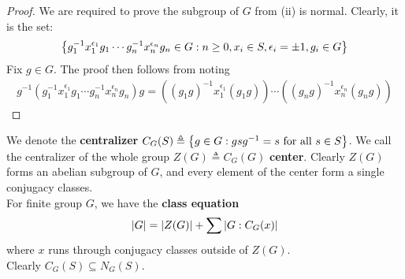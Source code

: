 \documentclass{report}
\begin{document}
\begin{proof}
We are required to prove the subgroup of $G$ from (ii) is normal. Clearly, it is the set:
\begin{align*}
\left\{ g_1^{-1}x_1^{\epsilon _1}g_1 \cdots g_n^{-1}x_n^{\epsilon_n}g_n \in G: n\geq 0,x_i \in S,\epsilon_i =\pm 1, g_i \in G  \right\}
\end{align*}
Fix $g \in G$. The proof then follows from noting
\begin{align*}
g^{-1}\left(g_1^{-1}x_1^{\epsilon _1}g_1 \cdots g_n^{-1}x_n^{\epsilon_n}g_n\right)g= \left( \left(g_1g\right)^{-1}x_1 ^{\epsilon _1} \left(g _1g  \right) \right) \cdots   \left( \left(g _ng\right)^{-1}x_n ^{\epsilon _n} \left(g_ng  \right) \right) 
\end{align*}
\end{proof}

We denote the \textbf{centralizer} $C_G(S)\triangleq \left\{ g \in G: gsg^{-1}=s\text{ for all }s \in S \right\}$. We call the centralizer of the whole group $Z(G)\triangleq C_G(G)$ \textbf{center}. Clearly $Z(G)$ forms an abelian subgroup of $G$, and every element of the center form a single conjugacy classes.     \\

For finite group $G$, we have the \textbf{class equation}
\begin{align*}
 \left|G\right| = \left|Z(G)\right|+ \sum \left|G: C_G(x)\right|
\end{align*}
where $x$ runs through conjugacy classes outside of  $Z(G)$. \\





Clearly $C_G(S)\subseteq N_G(S)$. 
\end{document}
